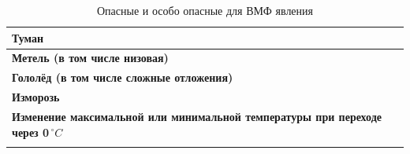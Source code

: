 \documentclass[a4paper, 12pt, twoside, final, book, russian, fittopage, cyremdash, openright]{ncc}
\newcommand{\grC}{\ensuremath{\,^\circ{}C}\xspace}
\begin{document}
\begin{longtable}{l|c|c|c|c|c|c}
  \multicolumn{7}{l}{\textbf{Туман}} \\*
  \midrule

  \multicolumn{7}{l}{\textbf{Метель (в том числе низовая)}} \\*
  \midrule

  \multicolumn{7}{l}{\textbf{Гололёд (в том числе сложные отложения)}} \\*
  \midrule

  \multicolumn{7}{l}{\textbf{Изморозь}} \\*
  \midrule

  \multicolumn{7}{l}{\textbf{Изменение максимальной или минимальной температуры при переходе через 0\grC}} \\*
  \midrule
  
  \bottomrule[2pt]
  \caption{Опасные и особо опасные для ВМФ явления}
\end{longtable}

\backmatter{}

\printindex
\end{document}

